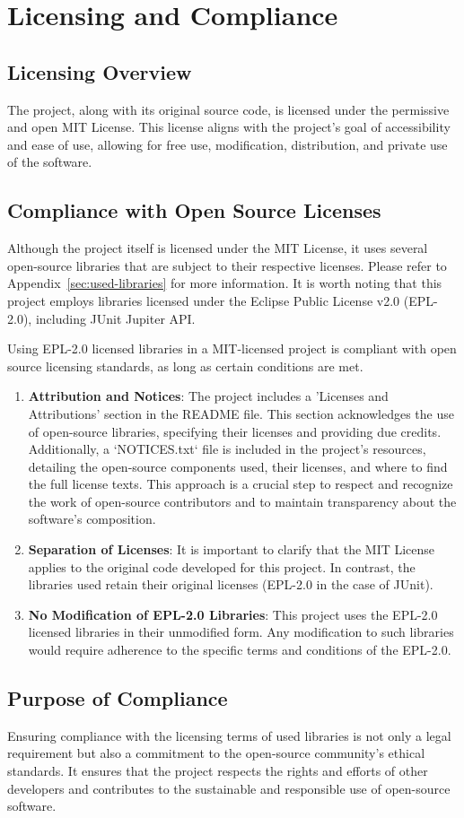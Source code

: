\section{Licensing and Compliance}

\subsection{Licensing Overview}
The project, along with its original source code, is licensed under the permissive and open MIT License. This license aligns with the project's goal of accessibility and ease of use, allowing for free use, modification, distribution, and private use of the software.

\subsection{Compliance with Open Source Licenses}
Although the project itself is licensed under the MIT License, it uses several open-source libraries that are subject to their respective licenses. Please refer to Appendix~\ref{sec:used-libraries} for more information. It is worth noting that this project employs libraries licensed under the Eclipse Public License v2.0 (EPL-2.0), including JUnit Jupiter API.

Using EPL-2.0 licensed libraries in a MIT-licensed project is compliant with open source licensing standards, as long as certain conditions are met.
\begin{enumerate}
    \item \textbf{Attribution and Notices}: The project includes a 'Licenses and Attributions' section in the README file. This section acknowledges the use of open-source libraries, specifying their licenses and providing due credits. Additionally, a `NOTICES.txt` file is included in the project's resources, detailing the open-source components used, their licenses, and where to find the full license texts. This approach is a crucial step to respect and recognize the work of open-source contributors and to maintain transparency about the software's composition.
    \item \textbf{Separation of Licenses}: It is important to clarify that the MIT License applies to the original code developed for this project. In contrast, the libraries used retain their original licenses (EPL-2.0 in the case of JUnit).
    \item \textbf{No Modification of EPL-2.0 Libraries}: This project uses the EPL-2.0 licensed libraries in their unmodified form. Any modification to such libraries would require adherence to the specific terms and conditions of the EPL-2.0.
\end{enumerate}

\subsection{Purpose of Compliance}
Ensuring compliance with the licensing terms of used libraries is not only a legal requirement but also a commitment to the open-source community's ethical standards. It ensures that the project respects the rights and efforts of other developers and contributes to the sustainable and responsible use of open-source software.
